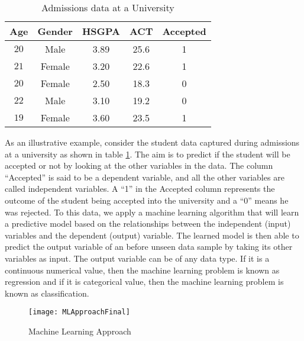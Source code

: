 \documentclass[11pt,openright]{report}
\begin{document}
 \begin{table}[!t]
	\renewcommand{\arraystretch}{1.3}
	\caption{Admissions data at a University}
	\label{table:example_db}
	\centering
	\begin{tabular}{|c|c|c|c|c|}
		\hline
		\bfseries Age & \bfseries Gender & \bfseries HSGPA & \bfseries ACT & \bfseries Accepted\\
		\hline
		$20$ & Male & 3.89 & 25.6 & 1\\ \hline
		$21$ & Female & 3.20 & 22.6 & 1\\ \hline
		$20$ & Female & 2.50 & 18.3 & 0\\ \hline
		$22$ & Male & 3.10 &  19.2 & 0\\ \hline
		$19$ & Female & 3.60 & 23.5 & 1\\ \hline
	\end{tabular}
\end{table}

As an illustrative example, consider the student data captured during admissions at a university as shown in table  \ref{table:example_db}. The aim is to predict if the student will be accepted or not by looking at the other variables in the data. The column ``Accepted'' is said to be a dependent variable, and all the other variables are called independent variables. A ``1'' in the Accepted column represents the outcome of the student being accepted into the university and a ``0'' means he was rejected. To this data, we apply a machine learning algorithm that will learn a predictive model based on the relationships between the independent (input) variables and the dependent (output) variable. The learned model is then able to predict the output variable of an before unseen data sample by taking its other variables as input. The output variable can be of any data type. If it is a continuous numerical value, then the machine learning problem is known as regression and if it is categorical value, then the machine learning problem is known as classification.
  \begin{figure}
	\centering
	\texttt{[image: MLApproachFinal]}
	\caption{Machine Learning Approach}
	\label{fig:predictive_analysis-approach}
\end{figure} 
\end{document}
